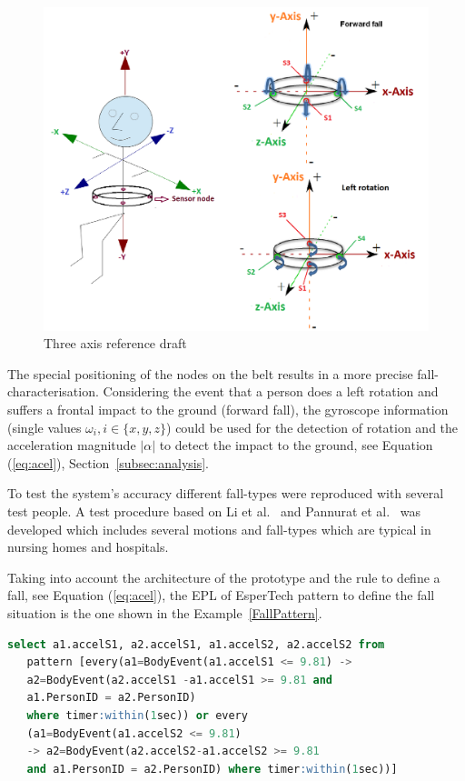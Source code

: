 \documentclass[journal]{IEEEtran}
\begin{document}
\begin{figure}[!ht]
  \centering
  \includegraphics[scale=0.2]{./img/axis}
  \caption[Three axis reference draft]{Three axis reference draft \cite{LaBlunda.2016b,LuigiMasterThesis}}
  \label{fig:axisreference}
\end{figure}

The special positioning of the nodes on the belt results in a more precise fall-characterisation. Considering 
the event that a person does a left rotation and suffers a frontal impact to the ground (forward fall), 
the gyroscope information (single values $\omega_{i}, i \in \{x,y,z\}$) could be used for the detection of rotation and the 
acceleration magnitude $|\alpha|$ to detect the impact to the ground, see Equation (\ref{eq:acel}), Section~\ref{subsec:analysis}.

To test the system's accuracy different fall-types were reproduced with several test people. A 
test procedure based on Li et al.~\cite{Li2009} and Pannurat et al.~\cite{Pannurat2014} was developed which includes 
several motions and fall-types which are typical in nursing homes and hospitals.

Taking into account the architecture of the prototype and the rule to define a fall, see Equation (\ref{eq:acel}), 
the EPL of EsperTech pattern to define the fall situation is the one shown in the Example~\ref{FallPattern}.

\begin{lstlisting}[basicstyle=\ttfamily\scriptsize,language=SQL,caption=Fall pattern,label=FallPattern]
  select a1.accelS1, a2.accelS1, a1.accelS2, a2.accelS2 from 
   pattern [every(a1=BodyEvent(a1.accelS1 <= 9.81) -> 
   a2=BodyEvent(a2.accelS1 -a1.accelS1 >= 9.81 and 
   a1.PersonID = a2.PersonID) 
   where timer:within(1sec)) or every 
   (a1=BodyEvent(a1.accelS2 <= 9.81)
   -> a2=BodyEvent(a2.accelS2-a1.accelS2 >= 9.81
   and a1.PersonID = a2.PersonID) where timer:within(1sec))]
 \end{lstlisting}
\end{document}
